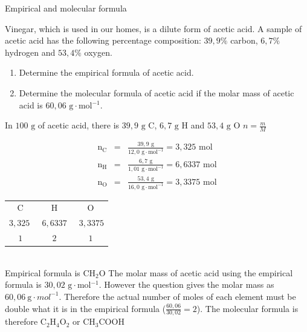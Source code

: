     \noindent
\label{m38712*secfhsst!!!underscore!!!id1308} 
      \noindent 
      \begin{wex}{Empirical and molecular formula
      }
 {
Vinegar, which is used in our homes, is a dilute form of acetic acid. A sample of acetic acid has the following percentage composition: $39,9\%$ carbon, $6,7\%$ hydrogen and $53,4\%$ oxygen.  
\begin{enumerate}[noitemsep, label=\textbf{\arabic*}. ] 
\item Determine the empirical formula of acetic acid.
\item Determine the molecular formula of acetic acid if the molar mass of acetic acid is $60,06 \text{ g} \cdot \text{mol}{}^{-1}$.
\end{enumerate}
     }
{
      \label{m38712*id281607}In $100 \text{ g}$ of acetic acid, there is $39,9 \text{ g C}$, $6,7 \text{ g H}$ and $53,4\text{ g O}$ 
      \label{m38712*id281633}
        $n=\frac{m}{M}$
      
      \label{m38712*id281653}\nopagebreak\noindent{}
        
    \begin{eqnarray*}
{\text{n}}_{\text{C}} & = & \frac{39,9 \text{ g}}{12,0 \text{ g} \cdot \text{mol}^{-1}} = 3,325 \text{ mol} \\
{\text{n}}_{\text{H}} & = & \frac{6,7 \text{ g}}{1,01 \text{ g} \cdot \text{mol}^{-1}} = 6,6337 \text{ mol} \\
{\text{n}}_{\text{O}} & = & \frac{53,4 \text{ g}}{16,0 \text{ g} \cdot \text{mol}^{-1}} = 3,3375 \text{ mol}
      \end{eqnarray*}
\begin{tabular}{c@{:}c@{:}c}
$\text{C}$ & $\text{H}$ & $\text{O}$\\
$3,325~$ & $~6,6337~$ & $~3,3375$ \\
$1$ & $2$ & $1$\\
\end{tabular}\\
Empirical formula is $\text{CH}{}_{2}\text{O}$ 
      \label{m38712*id281834}The molar mass of acetic acid using the empirical formula is $30,02 \text{ g} \cdot \text{mol}{}^{-1}$. However the question gives the molar mass as $60,06~\text{g}\cdot{mol}^{-1}$. Therefore the actual number of moles of each element must be double what it is in the empirical formula ($\frac{60,06}{30,02}=2$).
      \label{m38712*id281854}The molecular formula is therefore $\text{C}{}_{2}\text{H}{}_{4}\text{O}{}_{2}$ or $\text{CH}{}_{3}\text{COOH}$
}
    \end{wex}
